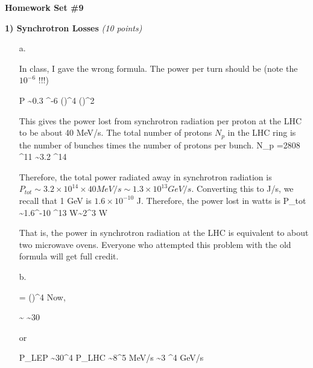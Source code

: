 


\thispagestyle{fancy}


\begin{center}
{\huge \textbf{Homework Set \#9 }}
\large


\end{center}

{\large

\textbf{1) Synchrotron Losses } \hfill \textit{(10 points)}\\

\begin{itemize}
\item[a.]{ 
In class,  I gave the wrong formula.  The power per turn should be (note the \textbf{$10^{-6}$} !!!)

\be
P \sim 0.3 ^{-6} \left(\right)^4 \left(\right)^2
\ee

This gives the power lost from synchrotron radiation per proton at the LHC to be about 40 MeV/s. 
The total number of protons $N_p$ in the LHC ring is the number of bunches times the number of protons per bunch.
\be
N_p =2808  ^{11} \sim 3.2 ^{14}
\ee

Therefore, the total power radiated away in synchrotron radiation is $P_{tot} \sim 3.2 \times 10^{14} \times 40 MeV/s \sim 1.3\times 10^{13} GeV/s$.
Converting this to J/s, we recall that 1 GeV is $1.6 \times 10^{-10}$ J. Therefore, the power lost in watts is
\be
P_{tot} \sim 1.6^{-10} ^{13} W\sim 2^3 W
\ee

That is, the power in synchrotron radiation at the LHC is equivalent to about two microwave ovens.
Everyone who attempted this problem with the old formula will get full credit.

}
\item[b.]{
\be
{} = \left(\right)^4
\ee
Now, 

\be
{} \sim {} \sim 30
\ee

or 

\be
P_{LEP} \sim 30^4 P_{LHC} \sim 8^5  MeV/s \sim 3 ^4 GeV/s 
\ee

}
\end{itemize}}
